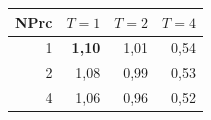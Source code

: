\begin{tabular}{@{}rrrr@{}}
\toprule
NPrc & $T=1$ & $T=2$ & $T=4$ \\
\midrule
1 & \textbf{1{,}10} & 1{,}01 & 0{,}54 \\
2 & 1{,}08 & 0{,}99 & 0{,}53 \\
4 & 1{,}06 & 0{,}96 & 0{,}52 \\
\bottomrule
\end{tabular}
